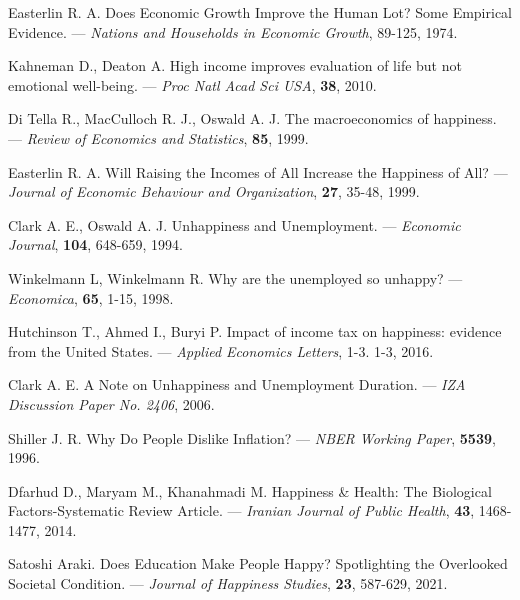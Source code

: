 \documentclass[russian]{vegareport}
\begin{document}
    \begin{thebibliography}{100}
            \bibitem{} \label{Easterlin}
            Easterlin R. A.
            Does Economic Growth Improve the Human Lot? Some Empirical Evidence.
            --- \textit{Nations and Households in Economic Growth}, 
            89-125, 1974.

            \bibitem{} \label{KahnemanDeaton}
            Kahneman D., Deaton A. 
            High income improves evaluation of life but not emotional well-being. 
            --- \textit{Proc Natl Acad Sci USA},
            \textbf{38}, 2010.

            \bibitem{} \label{DiTella}
            Di Tella R., MacCulloch R. J., Oswald A. J.
            The macroeconomics of happiness. 
           --- \textit{Review of Economics and Statistics}, 
            \textbf{85}, 1999. 

            \bibitem{} \label{Easterlin2}
            Easterlin R. A.
            Will Raising the Incomes of All Increase the Happiness of All?
            --- \textit{Journal of Economic Behaviour and Organization},
            \textbf{27}, 35-48, 1999. 

            \bibitem{} \label{Clark}
            Clark A. E., Oswald A. J.
            Unhappiness and Unemployment.
            --- \textit{Economic Journal}, 
            \textbf{104}, 648-659, 1994. 

            \bibitem{} \label{Winkelmann}
            Winkelmann L, Winkelmann R.
            Why are the unemployed so unhappy?
            --- \textit{Economica}, 
            \textbf{65}, 1-15, 1998. 

            \bibitem{} \label{tax}
            Hutchinson T., Ahmed I., Buryi P.
            Impact of income tax on happiness: evidence from the United States. 
            --- \textit{Applied Economics Letters}, 1-3.
            1-3, 2016.

            \bibitem{} \label{Clarkunemp}
            Clark A. E.
            A Note on Unhappiness and Unemployment Duration.
            --- \textit{IZA Discussion Paper No. 2406}, 
            2006. 
            
            \bibitem{} \label{Inflation}
            Shiller J. R.
            Why Do People Dislike Inflation?
            --- \textit{NBER Working Paper}, 
            \textbf{5539}, 1996. 

            \bibitem{} \label{medicine}
            Dfarhud D., Maryam M., Khanahmadi M. 
            Happiness \& Health: The Biological Factors-Systematic Review Article.
            --- \textit{Iranian Journal of Public Health}, 
            \textbf{43}, 1468-1477, 2014. 

            \bibitem{} \label{Education}
            Satoshi Araki.
            Does Education Make People Happy? Spotlighting the Overlooked Societal Condition.
            --- \textit{Journal of Happiness Studies}, 
            \textbf{23}, 587-629, 2021. 
        \end{thebibliography}
\end{document}
